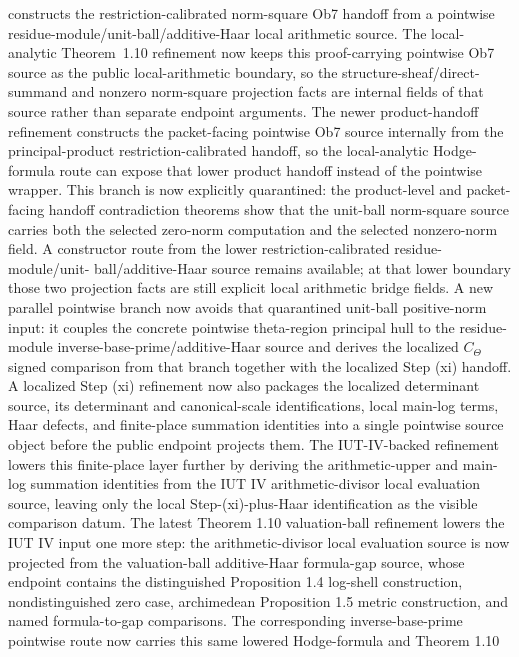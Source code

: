 \documentclass[11pt]{article}
\theoremstyle{plain}
\theoremstyle{definition}
\theoremstyle{remark}
\begin{document}
constructs the restriction-calibrated norm-square Ob7 handoff from a pointwise
residue-module/unit-ball/additive-Haar local arithmetic source.  The
local-analytic Theorem~1.10 refinement now keeps this proof-carrying pointwise
Ob7 source as the public local-arithmetic boundary, so the
structure-sheaf/direct-summand and nonzero norm-square projection facts are
internal fields of that source rather than separate endpoint arguments.  The
newer product-handoff refinement constructs the packet-facing pointwise Ob7
source internally from the principal-product restriction-calibrated handoff,
so the local-analytic Hodge-formula route can expose that lower product
handoff instead of the pointwise wrapper.  This branch is now explicitly
quarantined: the product-level and packet-facing handoff contradiction
theorems show that the unit-ball norm-square source carries both the selected
zero-norm computation and the selected nonzero-norm field.  A
constructor route from the lower restriction-calibrated residue-module/unit-
ball/additive-Haar source remains available; at that lower boundary those two
projection facts are still explicit local arithmetic bridge fields.  A
new parallel pointwise branch now avoids that quarantined unit-ball
positive-norm input: it couples the concrete pointwise theta-region principal
hull to the residue-module inverse-base-prime/additive-Haar source and derives
the localized \(C_\Theta\) signed comparison from that branch together with the
localized Step (xi) handoff.  A localized Step (xi) refinement now also
packages the localized determinant
source, its determinant and canonical-scale identifications, local main-log
terms, Haar defects, and finite-place summation identities into a single
pointwise source object before the public endpoint projects them.  The
IUT-IV-backed refinement lowers this finite-place layer further by deriving the
arithmetic-upper and main-log summation identities from the IUT IV
arithmetic-divisor local evaluation source, leaving only the local
Step-(xi)-plus-Haar identification as the visible comparison datum.  The
latest Theorem 1.10 valuation-ball refinement lowers the IUT IV input one more
step: the arithmetic-divisor local evaluation source is now projected from the
valuation-ball additive-Haar formula-gap source, whose endpoint contains the
distinguished Proposition 1.4 log-shell construction, nondistinguished zero
case, archimedean Proposition 1.5 metric construction, and named
formula-to-gap comparisons.  The corresponding inverse-base-prime pointwise
route now carries this same lowered Hodge-formula and Theorem 1.10
\end{document}
